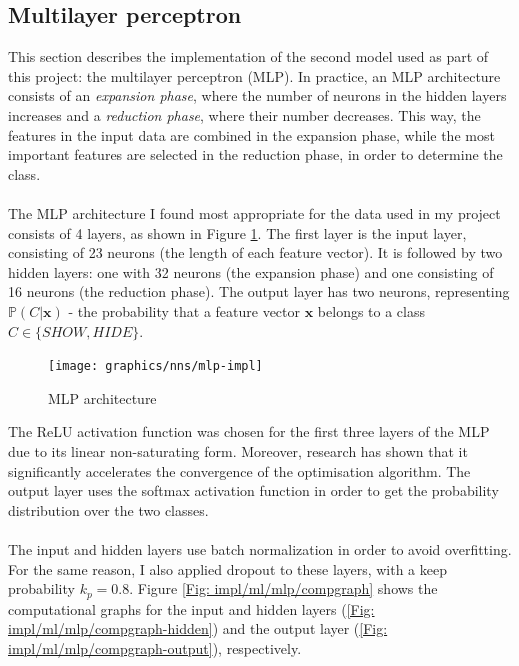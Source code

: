 	\subsection{Multilayer perceptron} \label{Section: impl/m/mlp}
	This section describes the implementation of the second model used as part of this project: the multilayer perceptron (MLP). In practice, an MLP architecture consists of an \textit{expansion phase}, where the number of neurons in the hidden layers increases and a \textit{reduction phase}, where their number decreases. This way, the features in the input data are combined in the expansion phase, while the most important features are selected in the reduction phase, in order to determine the class.
	\\ \\
	The MLP architecture I found most appropriate for the data used in my project consists of 4 layers, as shown in Figure \ref{Fig: impl/ml/mlp}. The first layer is the input layer, consisting of 23 neurons (the  length of each feature vector). It is followed by two hidden layers: one with 32 neurons (the expansion phase) and one consisting of 16 neurons (the reduction phase). The output layer has two neurons, representing $\mathbb{P}(C|\mathbf{x})$ - the probability that a feature vector $\mathbf{x}$ belongs to a class $C \in \{ SHOW, HIDE \}$.
	\begin{figure}[H]
		\centering
		\texttt{[image: graphics/nns/mlp-impl]}
		\caption{MLP architecture}
		\label{Fig: impl/ml/mlp}
	\end{figure} 

	The ReLU activation function was chosen for the first three layers of the MLP due to its linear non-saturating form. Moreover, research has shown that it significantly accelerates the convergence of the optimisation algorithm\cite{Nair:2010:RLU:3104322.3104425}. The output layer uses the softmax activation function in order to get the probability distribution over the two classes. 
	\\ \\
	The input and hidden layers use batch normalization in order to avoid overfitting. For the same reason, I also applied dropout to these layers, with a keep probability $k_p = 0.8$. Figure \ref{Fig: impl/ml/mlp/compgraph} shows the computational graphs for the input and hidden layers (\ref{Fig: impl/ml/mlp/compgraph-hidden}) and the output layer (\ref{Fig: impl/ml/mlp/compgraph-output}), respectively.
